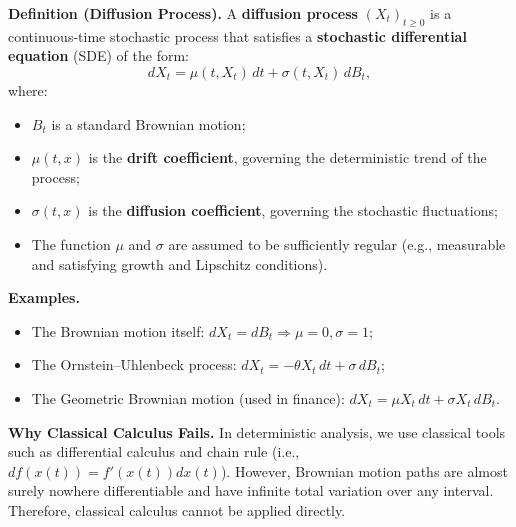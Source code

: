 

\textbf{Definition (Diffusion Process).}  
A \textbf{diffusion process} \( (X_t)_{t \geq 0} \) is a continuous-time stochastic process that satisfies a \textbf{stochastic differential equation} (SDE) of the form:
\[
dX_t = \mu(t, X_t) \, dt + \sigma(t, X_t) \, dB_t,
\]
where:
\begin{itemize}
  \item \( B_t \) is a standard Brownian motion;
  \item \( \mu(t, x) \) is the \textbf{drift coefficient}, governing the deterministic trend of the process;
  \item \( \sigma(t, x) \) is the \textbf{diffusion coefficient}, governing the stochastic fluctuations;
  \item The function \( \mu \) and \( \sigma \) are assumed to be sufficiently regular (e.g., measurable and satisfying growth and Lipschitz conditions).
\end{itemize}

\textbf{Examples.}
\begin{itemize}
  \item The Brownian motion itself: \( dX_t = dB_t \Rightarrow \mu = 0, \sigma = 1 \);
  \item The Ornstein–Uhlenbeck process: \( dX_t = -\theta X_t \, dt + \sigma \, dB_t \);
  \item The Geometric Brownian motion (used in finance): \( dX_t = \mu X_t \, dt + \sigma X_t \, dB_t \).
\end{itemize}

\vspace{1em}
\textbf{Why Classical Calculus Fails.}  
In deterministic analysis, we use classical tools such as differential calculus and chain rule (i.e., \( df(x(t)) = f'(x(t)) dx(t) \)).  
However, Brownian motion paths are almost surely nowhere differentiable and have infinite total variation over any interval. Therefore, classical calculus cannot be applied directly.

